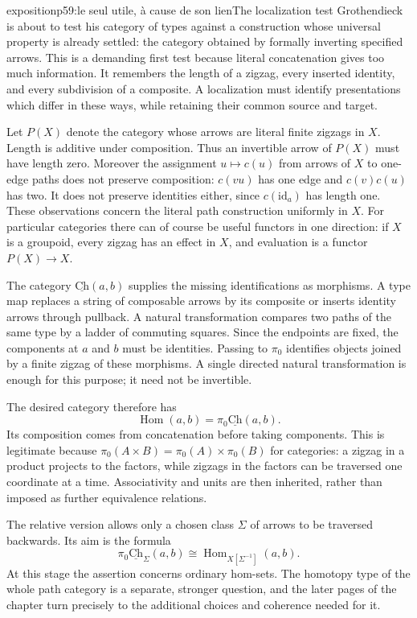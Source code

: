 \begin{dcomment}{exposition}{p59:le seul utile, à cause de son lien}{The localization test}
Grothendieck is about to test his category of types against a construction whose universal property is already settled: the category obtained by formally inverting specified arrows. This is a demanding first test because literal concatenation gives too much information. It remembers the length of a zigzag, every inserted identity, and every subdivision of a composite. A localization must identify presentations which differ in these ways, while retaining their common source and target.

Let $P(X)$ denote the category whose arrows are literal finite zigzags in $X$. Length is additive under composition. Thus an invertible arrow of $P(X)$ must have length zero. Moreover the assignment $u\mapsto c(u)$ from arrows of $X$ to one-edge paths does not preserve composition: $c(vu)$ has one edge and $c(v)c(u)$ has two. It does not preserve identities either, since $c(\mathrm{id}_a)$ has length one. These observations concern the literal path construction uniformly in $X$. For particular categories there can of course be useful functors in one direction: if $X$ is a groupoid, every zigzag has an effect in $X$, and evaluation is a functor $P(X)\to X$.

The category $\underline{\mathrm{Ch}}(a,b)$ supplies the missing identifications as morphisms. A type map replaces a string of composable arrows by its composite or inserts identity arrows through pullback. A natural transformation compares two paths of the same type by a ladder of commuting squares. Since the endpoints are fixed, the components at $a$ and $b$ must be identities. Passing to $\pi_0$ identifies objects joined by a finite zigzag of these morphisms. A single directed natural transformation is enough for this purpose; it need not be invertible.

The desired category therefore has
\[
 \operatorname{Hom}(a,b)=\pi_0\underline{\mathrm{Ch}}(a,b).
\]
Its composition comes from concatenation before taking components. This is legitimate because $\pi_0(A\times B)=\pi_0(A)\times\pi_0(B)$ for categories: a zigzag in a product projects to the factors, while zigzags in the factors can be traversed one coordinate at a time. Associativity and units are then inherited, rather than imposed as further equivalence relations.

The relative version allows only a chosen class $\Sigma$ of arrows to be traversed backwards. Its aim is the formula
\[
 \pi_0\underline{\mathrm{Ch}}_\Sigma(a,b)
       \cong \operatorname{Hom}_{X[\Sigma^{-1}]}(a,b).
\]
At this stage the assertion concerns ordinary hom-sets. The homotopy type of the whole path category is a separate, stronger question, and the later pages of the chapter turn precisely to the additional choices and coherence needed for it.
\end{dcomment}

